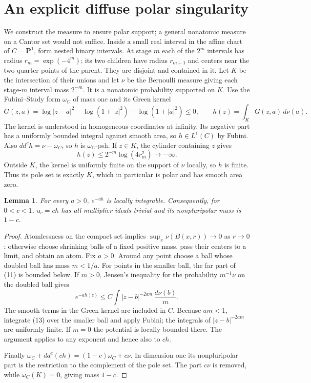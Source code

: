 \documentclass[11pt]{article}
\newtheorem{lemma}[theorem]{Lemma}
\newcommand{\ddc}{dd^c}
\begin{document}
\section{An explicit diffuse polar singularity}
We construct the measure to ensure polar support; a general nonatomic
measure on a Cantor set would not suffice. Inside a small real interval
in the affine chart of $C=\mathbf P^1$, form nested binary intervals.
At stage $m$ each of the $2^m$ intervals has radius
$r_m=\exp(-4^m)$; its two children have radius $r_{m+1}$ and centers
near the two quarter points of the parent. They are disjoint and
contained in it. Let $K$ be the intersection of their unions and let
$\nu$ be the Bernoulli measure giving each stage-$m$ interval mass
$2^{-m}$. It is a nonatomic probability supported on $K$.
Use the Fubini--Study form $\omega_C$ of mass one and its Green kernel
\[
 G(z,a)=\log|z-a|^2-\log(1+|z|^2)-\log(1+|a|^2)\le0,
 \qquad h(z)=\int_K G(z,a)\,d\nu(a).                         \tag{11}
\]
The kernel is understood in homogeneous coordinates at infinity.
Its negative part has a uniformly bounded integral against smooth
area, so $h\in L^1(C)$ by Fubini. Also
$\ddc h=\nu-\omega_C$, so $h$ is $\omega_C$-psh.
If $z\in K$, the cylinder containing $z$ gives
\[
 h(z)\le 2^{-m}\log(4r_m^2)\longrightarrow-\infty.          \tag{12}
\]
Outside $K$, the kernel is uniformly finite on the support of $\nu$
locally, so $h$ is finite. Thus its pole set is exactly $K$, which
in particular is polar and has smooth area zero.

\begin{lemma}\label{integrability}
For every $a>0$, $e^{-a h}$ is locally integrable. Consequently,
for $0<c<1$, $u_c=ch$ has all multiplier ideals trivial and
its nonpluripolar mass is $1-c$.
\end{lemma}
\begin{proof}
Atomlessness on the compact set implies
$\sup_x\nu(B(x,r))\to0$ as $r\to0$: otherwise choose shrinking
balls of a fixed positive mass, pass their centers to a limit, and
obtain an atom. Fix $a>0$. Around any point choose a ball whose
doubled ball has mass $m<1/a$. For points in the smaller ball,
the far part of (11) is bounded below. If $m>0$, Jensen's inequality
for the probability $m^{-1}\nu$ on the doubled ball gives
\[
 e^{-a h(z)}\le C\int |z-b|^{-2am}\,\frac{d\nu(b)}m.
                                                               \tag{13}
\]
The smooth terms in the Green kernel are included in $C$. Because
$am<1$, integrate (13) over the smaller ball and apply Fubini;
the integrals of $|z-b|^{-2am}$ are uniformly finite. If $m=0$
the potential is locally bounded there. The argument applies to
any exponent and hence also to $ch$.

Finally $\omega_C+\ddc(ch)=(1-c)\omega_C+c\nu$.
In dimension one its nonpluripolar part is the restriction to the
complement of the pole set. The part $c\nu$ is removed, while
$\omega_C(K)=0$, giving mass $1-c$.
\end{proof}
\end{document}
